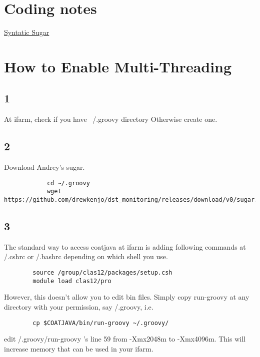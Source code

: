 \section{Coding notes}
\href{https://github.com/drewkenjo/dst_monitoring/wiki/Syntactic-sugar}{Syntatic Sugar}


\section{How to Enable Multi-Threading}

    \subsection{1}
        At ifarm, check if you have ~/.groovy  directory
        Otherwise create one.

    \subsection{2}
        Download Andrey’s sugar.
        
        \begin{lstlisting}
            cd ~/.groovy
            wget https://github.com/drewkenjo/dst_monitoring/releases/download/v0/sugar.jar
        \end{lstlisting}


    \subsection{3}
        The standard way to access coatjava at ifarm is adding following commands at \comtilde/.cshrc or \comtilde/.bashrc depending on which shell you use.
        
        \begin{lstlisting}
        source /group/clas12/packages/setup.csh
        module load clas12/pro
        \end{lstlisting}
        
        However, this doesn’t allow you to edit bin files.
        Simply copy run-groovy at any directory with your permission, say \comtilde/.groovy, i.e.
        
        \begin{lstlisting}
        cp $COATJAVA/bin/run-groovy ~/.groovy/
        \end{lstlisting}
        
        edit \comtilde/.groovy/run-groovy ’s line 59 from -Xmx2048m to -Xmx4096m. This will increase memory that can be used in your ifarm.
        
